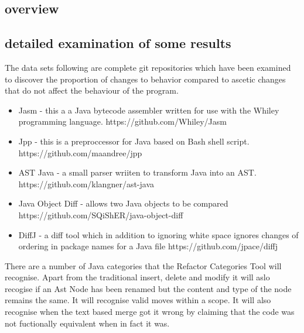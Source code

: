 \subsection{overview}
\subsection{detailed examination of some results}

The data sets following are complete git repositories which have been examined to discover the proportion of changes to behavior compared to ascetic changes that do not affect the behaviour of the program. 

% 
% 

\begin{itemize}
  \item Jasm - this a a Java bytecode assembler written for use with the Whiley programming language. https://github.com/Whiley/Jasm
  \item Jpp - this is a preproccessor for Java based on Bash shell script. https://github.com/maandree/jpp
  \item AST Java - a small parser wriiten to transform Java into an AST. https://github.com/klangner/ast-java
  \item Java Object Diff - allows two Java objects to be compared https://github.com/SQiShER/java-object-diff
  \item DiffJ - a diff tool which in addition to ignoring white space ignores changes of ordering in package names for a Java file https://github.com/jpace/diffj
\end{itemize}


There are a number of Java categories that the Refactor Categories Tool will recognise.  Apart from the traditional insert, delete and modify it will aslo recogise if an Ast Node has been renamed but the content and type of the node remains the same.  It will recognise valid moves within a scope. It will also recognise when the text based merge got it wrong by claiming that the code was not fuctionally equivalent when in fact it was.


